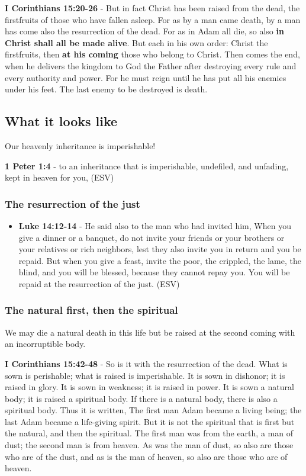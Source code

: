 \documentclass[11pt]{article}
\begin{document}
\textbf{I Corinthians 15:20-26} - But in fact Christ has been raised from the dead, the firstfruits of those who have fallen asleep.  For as by a man came death, by a man has come also the resurrection of the dead.  For as in Adam all die, so also \textbf{in Christ shall all be made alive}.  But each in his own order: Christ the firstfruits, then \textbf{at his coming} those who belong to Christ.  Then comes the end, when he delivers the kingdom to God the Father after destroying every rule and every authority and power.  For he must reign until he has put all his enemies under his feet.  The last enemy to be destroyed is death.

\subsection{What it looks like}
\label{sec:org494e9e5}
Our heavenly inheritance is imperishable!

\textbf{1 Peter 1:4} -  to an inheritance that is imperishable, undefiled, and unfading, kept in heaven for you,  (ESV)

\subsubsection{The resurrection of the just}
\label{sec:org7b1e2c1}
\begin{itemize}
\item \textbf{Luke 14:12-14} - He said also to the man who had invited him, When you give a dinner or a banquet, do not invite your friends or your brothers or your relatives or rich neighbors, lest they also invite you in return and you be repaid. But when you give a feast, invite the poor, the crippled, the lame, the blind, and you will be blessed, because they cannot repay you. You will be repaid at the resurrection of the just. (ESV)
\end{itemize}

\subsubsection{The natural first, then the spiritual}
\label{sec:org9b89ea9}
We may die a natural death in this life but be raised at the second coming with an incorruptible body.

\textbf{I Corinthians 15:42-48} - So is it with the resurrection of the dead. What is sown is perishable; what is raised is imperishable.  It is sown in dishonor; it is raised in glory. It is sown in weakness; it is raised in power.  It is sown a natural body; it is raised a spiritual body. If there is a natural body, there is also a spiritual body.  Thus it is written, The first man Adam became a living being; the last Adam became a life-giving spirit.  But it is not the spiritual that is first but the natural, and then the spiritual.  The first man was from the earth, a man of dust; the second man is from heaven.  As was the man of dust, so also are those who are of the dust, and as is the man of heaven, so also are those who are of heaven.
\end{document}
